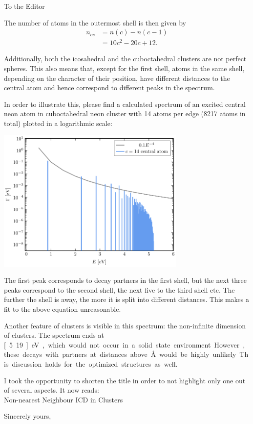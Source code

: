 \documentclass[DIN,pagenumber=false,parskip=half,fromalign=left,fromphone=true,fromemail=true,fromurl=false,fromlogo=false,fromrule=false]{scrlttr2}
\begin{document}
\begin{letter}{To the Editor}
\begin{enumerate}
      The number of atoms in the outermost shell is then given by
      \begin{align*}
       n_{os} &= n(c) - n(c-1)\\
              &= 10 c^2 - 20c + 12 .
      \end{align*}

      Additionally, both the icosahedral and the cuboctahedral clusters are not
      perfect spheres. This also means that, except for the first shell,
      atoms in the same shell, depending on the
      character of their position, have different distances to the central atom and
      hence correspond to different peaks in the spectrum.

      In order to illustrate this,
      please find a calculated spectrum of an excited central neon atom in cuboctahedral
      neon cluster with 14 atoms per edge (8217 atoms in total) plotted in a logarithmic
      scale:
       
      \begin{center}
       \includegraphics[width=0.7\textwidth]{../pics/center.pdf}
      \end{center}
      The first peak corresponds to decay partners in the first shell, but the
      next three peaks correspond to the second shell, the next five to the third
      shell etc. The further the shell is away, the more it is split into
      different distances. This makes a fit to the above equation unreasonable.

      Another feature of clusters is visible in this spectrum: the non-infinite
      dimension of clusters. The spectrum ends at \unit[5.19]{eV}, which would not occur
      in a solid state environment. However, these decays with partners at distances
      above \unit[80]{\AA} would be highly unlikely.

      This discussion holds for the optimized structures as well.

\end{enumerate}


I took the opportunity to shorten the title in order to not highlight only
one out of several aspects. It now reads:\\
      Non-nearest Neighbour ICD in 
      Clusters


        \closing{Sincerely yours,}
	\end{letter}
\end{document}
